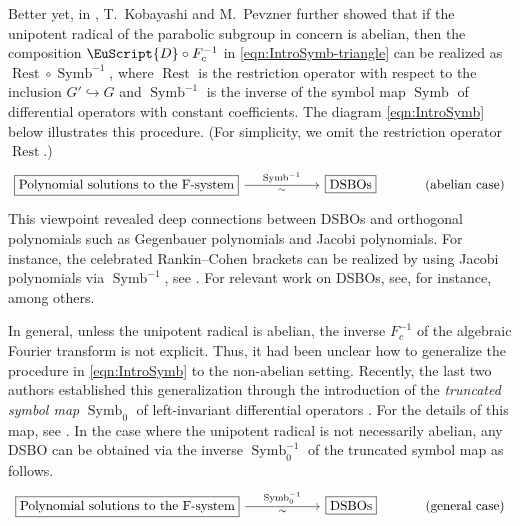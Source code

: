 \documentclass[a4paper,11pt,reqno]{amsart}
\newcommand{\0}{{\bf 0}}
\newcommand{\1}{{\bf 1}}
\DeclareMathOperator{\Symb}{Symb}
\DeclareMathOperator{\Rest}{Rest}
\theoremstyle{plain}
\theoremstyle{definition}
\numberwithin{equation}{section}
\theoremstyle{definition}
\begin{document}
Better yet,
in \cite{KoPe16a,KoPe16b}, T.~Kobayashi and M.~Pevzner further
showed that if the unipotent radical of the parabolic subgroup in concern is abelian, then the composition $\EuScript{D} \circ F_c^{-1}$ 
in \eqref{eqn:IntroSymb-triangle}
can be realized as
$\Rest \circ \Symb^{-1}$,
where $\Rest$ is the restriction operator with respect to the inclusion $G'\hookrightarrow G$
and $\Symb^{-1}$ is the inverse of the symbol map $\Symb$ of differential operators with constant coefficients. The diagram \eqref{eqn:IntroSymb} below 
illustrates this procedure. (For simplicity, we omit the restriction operator 
$\Rest$.)
\begin{equation}
\label{eqn:IntroSymb}
\begin{tikzcd}[column sep=1cm]
	{\fbox{Polynomial solutions to the F-system}} && {\fbox{DSBOs}}
	&{\text{(abelian case)}} 
	\arrow["{\operatorname{Symb}^{-1}}","{\sim}"', from=1-1, to=1-3]
\end{tikzcd}
\end{equation}
This viewpoint revealed deep connections between DSBOs and orthogonal polynomials such as Gegenbauer polynomials and Jacobi polynomials. 
For instance, the celebrated Rankin--Cohen brackets can be realized by using 
Jacobi polynomials via $\Symb^{-1}$, see \cite[Thm.\ 8.1]{KoPe16b}.
For relevant work on DSBOs, see, for instance,
\cite{Kobayashi13, Kobayashi14, KoKuPe16, KoPe16a, KoPe16b, KOSS15, KuOr26, Nakahama23,PV23, PV26b,  PV26a,Somberg25} among others.

In general, unless the unipotent radical is abelian, the inverse $F_c^{-1}$ of the algebraic Fourier transform is not explicit. Thus, it had been unclear how to generalize the procedure in \eqref{eqn:IntroSymb} to the non-abelian setting.
Recently, the last two authors established 
this generalization
through the introduction of the \emph{truncated symbol map} $\Symb_0$ 
of left-invariant differential operators \cite{KPV25}.
For the details of this map, see \cite[Sect.~3]{KPV25}. 
In the case where the unipotent radical is not necessarily abelian, 
any DSBO can be obtained via 
the inverse $\Symb_0^{-1}$ of the truncated symbol map as follows.
\begin{equation}\label{eqn:IntroSymb2}
\begin{tikzcd}[column sep=1cm]
	{\fbox{Polynomial solutions to the F-system}} && {\fbox{DSBOs}}
	&{\text{(general case)}} 
	\arrow["{\operatorname{Symb}_0^{-1}}", "{\sim}"', from=1-1, to=1-3]
\end{tikzcd}
\end{equation}
\end{document}
